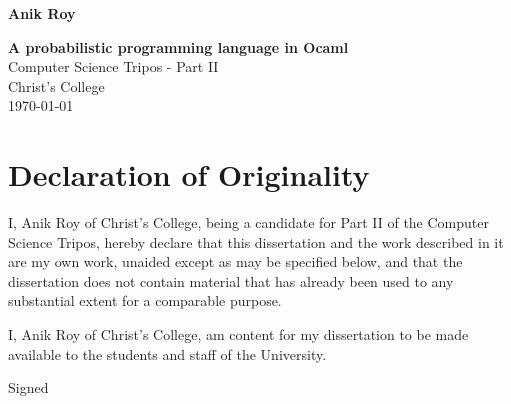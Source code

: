 \documentclass[12pt,notitlepage,a4paper]{report}
\begin{document}





\pagestyle{empty}

\hfill{\LARGE \bf Anik Roy}

\vspace*{60mm}
\begin{center}
	\Huge
	{\bf A probabilistic programming language in Ocaml} \\
	\vspace*{5mm}
	Computer Science Tripos - Part II \\
	\vspace*{5mm}
	Christ's College \\
	\vspace*{5mm}
	\today  %
\end{center}

\cleardoublepage


\setcounter{page}{1}
\pagestyle{plain}

\chapter*{Declaration of Originality}

I, Anik Roy of Christ's College, being a candidate for Part II of the Computer Science Tripos, hereby declare that this dissertation and the work described in it are my own work, unaided except as may be specified below, and that the dissertation does not contain material that has already been used to any substantial extent for a comparable purpose.

I, Anik Roy of Christ's College, am content for my dissertation to be made available to the students and staff of the University. 

\bigskip
\noindent Signed 
\end{document}
